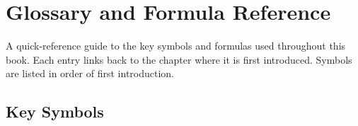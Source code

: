 \documentclass[
  letterpaper,
  DIV=11,
  numbers=noendperiod]{scrreprt}
\begin{document}

\chapter*{Glossary and Formula Reference}\label{sec-glossary}


A quick-reference guide to the key symbols and formulas used throughout
this book. Each entry links back to the chapter where it is first
introduced. Symbols are listed in order of first introduction.

\section*{Key Symbols}\label{key-symbols}

\end{document}
